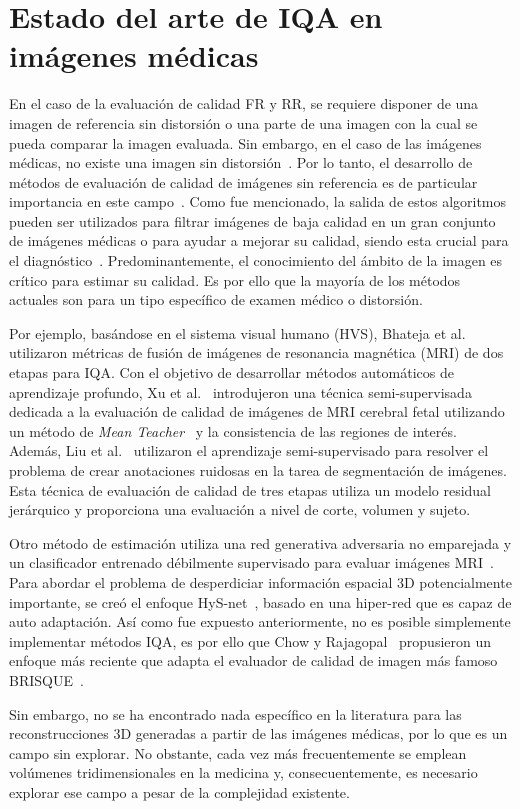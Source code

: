 \section{Estado del arte de IQA en imágenes médicas}
En el caso de la evaluación de calidad FR y RR, se requiere disponer 
de una imagen de referencia sin distorsión o una parte de una imagen con la cual 
se pueda comparar la imagen evaluada. Sin embargo, en el caso de las imágenes médicas, 
no existe una imagen sin distorsión~\cite{DicomDistortionsExample}. 
Por lo tanto, el desarrollo de métodos de evaluación de calidad de imágenes 
sin referencia es de particular importancia en este campo~\cite{LGP, BRISQUE, IQA-CNN, DIQaM, Hallucinated-IQA}.
Como fue mencionado, la salida de estos algoritmos pueden ser utilizados 
para filtrar imágenes de baja calidad en un gran conjunto de imágenes médicas o 
para ayudar a mejorar su calidad, siendo esta crucial para el diagnóstico~\cite{DicomDistortionsExample}.
Predominantemente, el conocimiento del ámbito de la imagen es crítico para estimar 
su calidad. Es por ello que la mayoría de los métodos actuales son para un tipo específico 
de examen médico o distorsión.

Por ejemplo, basándose en el sistema visual humano (HVS), 
Bhateja et al.~\cite{MultiModalMRIFusionMethod} utilizaron métricas de fusión
de imágenes de resonancia magnética (MRI) de dos etapas para IQA.
Con el objetivo de desarrollar métodos automáticos de aprendizaje profundo,
Xu et al.~\cite{SemiSupervisedMRIFetalBrain} introdujeron una técnica semi-supervisada dedicada a la evaluación de 
calidad de imágenes de MRI cerebral fetal utilizando un método de 
\emph{Mean Teacher}~\cite{MeanTeacher} y la consistencia de las regiones de interés. 
Además, Liu et al.~\cite{IQAForPediatricMRIWithNoisySegmentation} utilizaron el aprendizaje semi-supervisado para resolver 
el problema de crear anotaciones ruidosas en la tarea de segmentación de imágenes. 
Esta técnica de evaluación de calidad de tres etapas utiliza un modelo residual 
jerárquico y proporciona una evaluación a nivel de corte, volumen y sujeto. 

Otro método de estimación utiliza una red generativa adversaria no emparejada 
y un clasificador entrenado débilmente supervisado para evaluar imágenes MRI~\cite{MIGAN}.
Para abordar el problema de desperdiciar información espacial 3D potencialmente importante, 
se creó el enfoque HyS-net~\cite{Hys-net}, basado en una hiper-red que es capaz de 
auto adaptación. Así como fue expuesto anteriormente, no es posible 
simplemente implementar métodos IQA, es por ello que Chow y Rajagopal~\cite{MedicalBRISQUE} 
propusieron un enfoque más reciente que adapta el evaluador de calidad de imagen más famoso BRISQUE~\cite{BRISQUE}.

Sin embargo, no se ha encontrado nada específico en la literatura para las 
reconstrucciones 3D generadas a partir de las imágenes médicas, por lo que es un campo sin explorar. 
No obstante, cada vez más frecuentemente se emplean 
volúmenes tridimensionales en la medicina y, consecuentemente, es necesario explorar ese 
campo a pesar de la complejidad existente.
